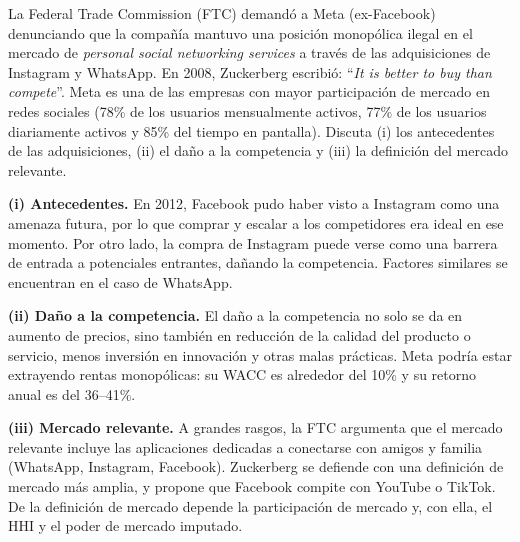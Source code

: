 \question La Federal Trade Commission (FTC) demandó a Meta (ex-Facebook) denunciando que la compañía mantuvo una posición monopólica ilegal en el mercado de \emph{personal social networking services} a través de las adquisiciones de Instagram y WhatsApp. En 2008, Zuckerberg escribió: ``\emph{It is better to buy than compete}''. Meta es una de las empresas con mayor participación de mercado en redes sociales (78\% de los usuarios mensualmente activos, 77\% de los usuarios diariamente activos y 85\% del tiempo en pantalla). Discuta (i) los antecedentes de las adquisiciones, (ii) el daño a la competencia y (iii) la definición del mercado relevante.
\begin{solution}
\textbf{(i) Antecedentes.} En 2012, Facebook pudo haber visto a Instagram como una amenaza futura, por lo que comprar y escalar a los competidores era ideal en ese momento. Por otro lado, la compra de Instagram puede verse como una barrera de entrada a potenciales entrantes, dañando la competencia. Factores similares se encuentran en el caso de WhatsApp.

\textbf{(ii) Daño a la competencia.} El daño a la competencia no solo se da en aumento de precios, sino también en reducción de la calidad del producto o servicio, menos inversión en innovación y otras malas prácticas. Meta podría estar extrayendo rentas monopólicas: su WACC es alrededor del 10\% y su retorno anual es del 36--41\%.

\textbf{(iii) Mercado relevante.} A grandes rasgos, la FTC argumenta que el mercado relevante incluye las aplicaciones dedicadas a conectarse con amigos y familia (WhatsApp, Instagram, Facebook). Zuckerberg se defiende con una definición de mercado más amplia, y propone que Facebook compite con YouTube o TikTok. De la definición de mercado depende la participación de mercado y, con ella, el HHI y el poder de mercado imputado.

\end{solution}
